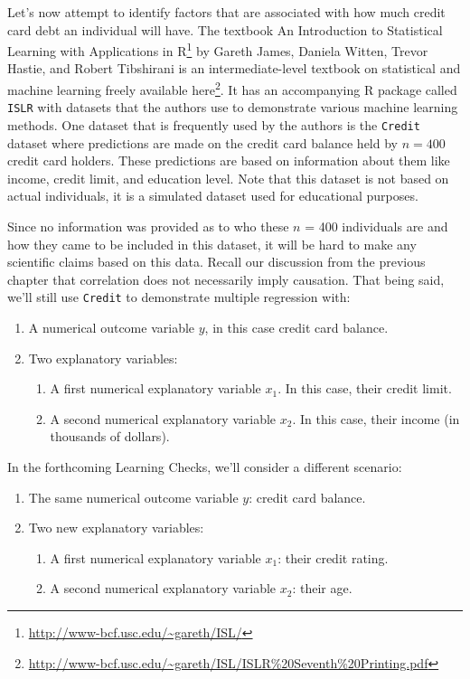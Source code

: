 \documentclass[12pt,]{krantz}
\providecommand{\tightlist}{%
  \setlength{\itemsep}{0pt}\setlength{\parskip}{0pt}}
\renewcommand{\href}[2]{#2\footnote{\url{#1}}}
\begin{document}
Let's now attempt to identify factors that are associated with how much
credit card debt an individual will have. The textbook
\href{http://www-bcf.usc.edu/~gareth/ISL/}{An Introduction to
Statistical Learning with Applications in R} by Gareth James, Daniela
Witten, Trevor Hastie, and Robert Tibshirani is an intermediate-level
textbook on statistical and machine learning freely available
\href{http://www-bcf.usc.edu/~gareth/ISL/ISLR\%20Seventh\%20Printing.pdf}{here}.
It has an accompanying R package called \texttt{ISLR} with datasets that
the authors use to demonstrate various machine learning methods. One
dataset that is frequently used by the authors is the \texttt{Credit}
dataset where predictions are made on the credit card balance held by
\(n = 400\) credit card holders. These predictions are based on
information about them like income, credit limit, and education level.
Note that this dataset is not based on actual individuals, it is a
simulated dataset used for educational purposes.

Since no information was provided as to who these \(n\) = 400
individuals are and how they came to be included in this dataset, it
will be hard to make any scientific claims based on this data. Recall
our discussion from the previous chapter that correlation does not
necessarily imply causation. That being said, we'll still use
\texttt{Credit} to demonstrate multiple regression with:

\begin{enumerate}
\def\labelenumi{\arabic{enumi}.}
\tightlist
\item
  A numerical outcome variable \(y\), in this case credit card balance.
\item
  Two explanatory variables:

  \begin{enumerate}
  \def\labelenumii{\arabic{enumii}.}
  \tightlist
  \item
    A first numerical explanatory variable \(x_1\). In this case, their
    credit limit.
  \item
    A second numerical explanatory variable \(x_2\). In this case, their
    income (in thousands of dollars).
  \end{enumerate}
\end{enumerate}

In the forthcoming Learning Checks, we'll consider a different scenario:

\begin{enumerate}
\def\labelenumi{\arabic{enumi}.}
\tightlist
\item
  The same numerical outcome variable \(y\): credit card balance.
\item
  Two new explanatory variables:

  \begin{enumerate}
  \def\labelenumii{\arabic{enumii}.}
  \tightlist
  \item
    A first numerical explanatory variable \(x_1\): their credit rating.
  \item
    A second numerical explanatory variable \(x_2\): their age.
  \end{enumerate}
\end{enumerate}
\end{document}
